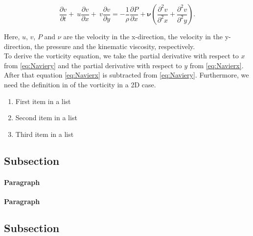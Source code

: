 \documentclass[fleqn,12pt]{NTFD} %
\begin{document}
\begin{equation}
\frac{\partial v}{\partial t} + \ u \frac{\partial v} {\partial x} +   \ v \frac{\partial v}{\partial y} = -\frac{1}{\rho} \frac{\partial P}{\partial x} +  \boldsymbol{\nu} \left(\frac{\partial^2 v}{\partial^2 x} + \frac{\partial^2 v}{\partial^2 y} \right) .
\label{eq:Naviery}
\end{equation}

Here, $u$, $v$, $P$ and $\nu$ are the velocity in the x-direction, the velocity in the y-direction, the pressure and the kinematic viscosity, respectively.  
\\
To derive the vorticity equation, we take the partial derivative with respect to $x$ from \eqref{eq:Naviery} and the partial derivative with respect to $y$ from \eqref{eq:Navierx}. After that equation \eqref{eq:Navierx} is subtracted from \eqref{eq:Naviery}. Furthermore, we need the definition in of the vorticity in a 2D case.

\lipsum[4] %



\lipsum[5] %

\begin{enumerate}[noitemsep] %
\item First item in a list
\item Second item in a list
\item Third item in a list
\end{enumerate}

\subsection{Subsection}

\lipsum[6] %

\paragraph{Paragraph} \lipsum[7] %
\paragraph{Paragraph} \lipsum[8] %

\subsection{Subsection}

\lipsum[9] %
\end{document}
